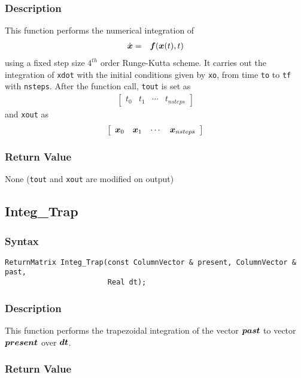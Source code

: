 \documentclass[dvips,11pt,fleqn]{report}
\newcommand{\mbold}[1]{\mbox{\boldmath $ #1 $}}
\newcommand{\matr}[2]{\left[\begin{array}{#1} #2 \end{array}\right]}
\begin{document}
\subsubsection*{Description}
This function performs the numerical integration of 
\begin{eqnarray}
\dot{\mbold{x}} & = & \mbold{f}(\mbold{x}(t),t)
\end{eqnarray}
using a fixed step size $4^{th}$ order Runge-Kutta scheme.  It carries
out the integration of {\tt xdot} with the initial conditions given by
{\tt xo}, from time {\tt to} to {\tt tf} with {\tt nsteps}. After the
function call, {\tt tout} is set as
\begin{eqnarray}
\matr{cccc}{ t_0 & t_1 & \cdots & t_{nsteps}}
\end{eqnarray}
and {\tt xout} as
\begin{eqnarray}
\matr{cccc}{ \mbold{x}_0 & \mbold{x}_1 & \cdots & \mbold{x}_{nsteps}}
\end{eqnarray}



\subsubsection*{Return Value}

None ({\tt tout} and {\tt xout} are modified on output)

\newpage

\subsection*{Integ\_Trap}
\subsubsection*{Syntax}
\begin{verbatim}
ReturnMatrix Integ_Trap(const ColumnVector & present, ColumnVector & past, 
                        Real dt);
\end{verbatim}
\subsubsection*{Description}
This function performs the trapezoidal integration of the vector
$\mbold{past}$ to vector $\mbold{present}$ over $\mbold{dt}$.


\subsubsection*{Return Value}
\end{document}
